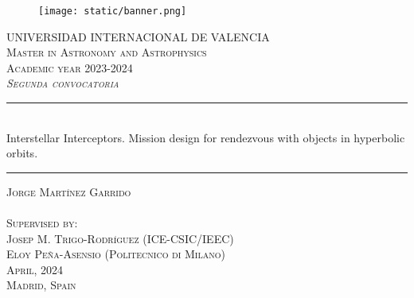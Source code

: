 \begin{titlepage}

  \begin{center}

    \begin{figure}[h]
      \centering
      \texttt{[image: static/banner.png]}
    \end{figure}
    \vspace{1cm}

    \textsc{\large
      UNIVERSIDAD INTERNACIONAL DE VALENCIA
    }\\[0.25cm]
    \textsc{\large
      Master in Astronomy and Astrophysics \\
      Academic year 2023-2024
    }\\[1cm]
    \textsc{\large
      \textit{Segunda convocatoria}
    }\\[1.25cm]

    \noindent\rule{\textwidth}{1pt}
    \\[0.25cm]
    {
    \fontsize{35pt}{35pt}\selectfont
    {
      Interstellar Interceptors. Mission design for rendezvous with objects in hyperbolic orbits.
    }
    }
    \noindent\rule{\textwidth}{1pt}

    \vspace{1.5cm}
    \textsc{\Large
      Jorge Martínez Garrido \\
    }\\[1.25cm]
    \textsc{\large
      Supervised by:
    }\\[0.25cm]
    \textsc{\large
      Josep M. Trigo-Rodríguez (ICE-CSIC/IEEC) \\
      Eloy Peña-Asensio (Politecnico di Milano)
    }\\[1.5cm]

    \textsc{\large
      April, 2024
    }\\[0.25cm]
    \textsc{\large
      Madrid, Spain
    }\\[0.25cm]

  \end{center}
\end{titlepage}
